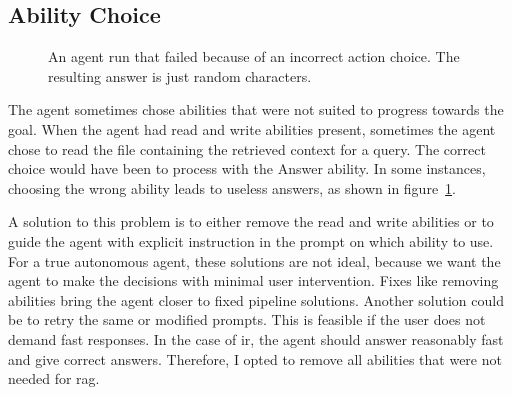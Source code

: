 \documentclass[../main.tex]{subfiles}
\begin{document}
\subsection{Ability Choice}

\begin{figure}[t]
    \centering
    \caption{An agent run that failed because of an incorrect action choice.
        The resulting answer is just random characters.}
    \label{fig:bad_agent_run}
\end{figure}

The agent sometimes chose abilities that were not suited to progress towards the goal.
When the agent had read and write abilities present, sometimes the agent chose to
read the file containing the retrieved context for a query.
The correct choice would have been to process with the Answer ability.
In some instances, choosing the wrong ability leads to useless answers,
as shown in figure~\ref{fig:bad_agent_run}.

A solution to this problem is to either remove the read and write abilities
or to guide the agent with explicit instruction in the prompt on which ability to use.
For a true autonomous agent, these solutions are not ideal, because we want the
agent to make the decisions with minimal user intervention.
Fixes like removing abilities bring the agent closer to fixed pipeline solutions.
Another solution could be to retry the same or modified prompts.
This is feasible if the user does not demand fast responses.
In the case of \gls{ir}, the agent should answer reasonably fast and
give correct answers.
Therefore, I opted to remove all abilities that were not needed for \gls{rag}.
\end{document}
